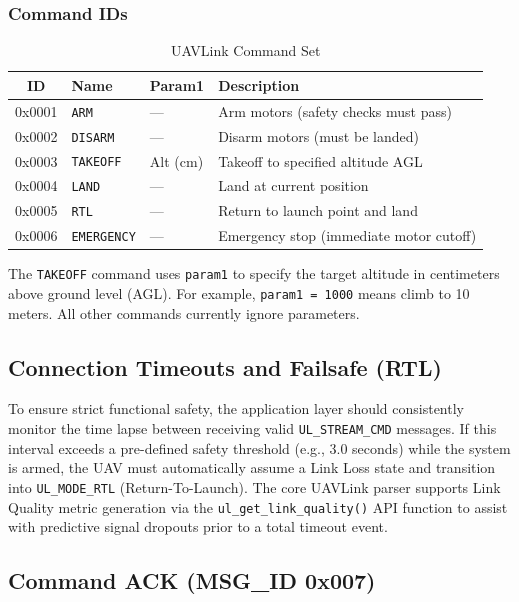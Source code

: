 \documentclass[11pt,a4paper]{article}
\begin{document}
\subsubsection{Command IDs}

\begin{table}[H]
\centering
\begin{tabular}{@{}clll@{}}
\toprule
\textbf{ID} & \textbf{Name} & \textbf{Param1} & \textbf{Description} \\
\midrule
0x0001 & \texttt{ARM}       & --- & Arm motors (safety checks must pass) \\
0x0002 & \texttt{DISARM}    & --- & Disarm motors (must be landed) \\
0x0003 & \texttt{TAKEOFF}   & Alt (cm) & Takeoff to specified altitude AGL \\
0x0004 & \texttt{LAND}      & --- & Land at current position \\
0x0005 & \texttt{RTL}       & --- & Return to launch point and land \\
0x0006 & \texttt{EMERGENCY} & --- & Emergency stop (immediate motor cutoff) \\
\bottomrule
\end{tabular}
\caption{UAVLink Command Set}
\end{table}

\begin{notebox}
The \texttt{TAKEOFF} command uses \texttt{param1} to specify the target altitude in centimeters above ground level (AGL). For example, \texttt{param1 = 1000} means climb to 10 meters. All other commands currently ignore parameters.
\end{notebox}

\subsection{Connection Timeouts and Failsafe (RTL)}
To ensure strict functional safety, the application layer should consistently monitor the time lapse between receiving valid \texttt{UL\_STREAM\_CMD} messages. If this interval exceeds a pre-defined safety threshold (e.g., 3.0 seconds) while the system is armed, the UAV must automatically assume a Link Loss state and transition into \texttt{UL\_MODE\_RTL} (Return-To-Launch). The core UAVLink parser supports Link Quality metric generation via the \texttt{ul\_get\_link\_quality()} API function to assist with predictive signal dropouts prior to a total timeout event.

\subsection{Command ACK (MSG\_ID 0x007)}
\end{document}
